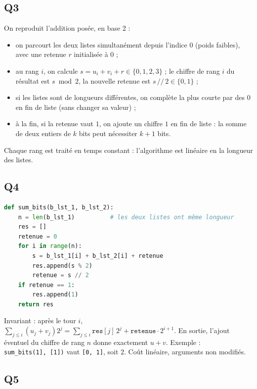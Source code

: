 \documentclass[11pt,a4paper]{article}
\providecommand{\tightlist}{\setlength{\itemsep}{0pt}\setlength{\parskip}{0pt}}
\begin{document}
\hypertarget{q3}{%
\subsection{Q3}\label{q3}}

On reproduit l'addition posée, en base 2 :

\begin{itemize}
\tightlist
\item
  on parcourt les deux listes simultanément depuis l'indice \(0\) (poids faibles), avec une retenue \(r\) initialisée à \(0\) ;
\item
  au rang \(i\), on calcule \(s = u_i + v_i + r \in \{0, 1, 2, 3\}\) ; le chiffre de rang \(i\) du résultat est \(s \bmod 2\), la nouvelle retenue est \(s \,//\, 2 \in \{0, 1\}\) ;
\item
  si les listes sont de longueurs différentes, on complète la plus courte par des \(0\) en fin de liste (sans changer sa valeur) ;
\item
  à la fin, si la retenue vaut \(1\), on ajoute un chiffre \(1\) en fin de liste : la somme de deux entiers de \(k\) bits peut nécessiter \(k+1\) bits.
\end{itemize}

Chaque rang est traité en temps constant : l'algorithme est linéaire en la longueur des listes.

\hypertarget{q4}{%
\subsection{Q4}\label{q4}}

\begin{lstlisting}[language=Python]
def sum_bits(b_lst_1, b_lst_2):
    n = len(b_lst_1)          # les deux listes ont même longueur
    res = []
    retenue = 0
    for i in range(n):
        s = b_lst_1[i] + b_lst_2[i] + retenue
        res.append(s % 2)
        retenue = s // 2
    if retenue == 1:
        res.append(1)
    return res
\end{lstlisting}

Invariant : après le tour \(i\), \(\sum_{j \le i}(u_j + v_j) 2^j = \sum_{j \le i} \texttt{res}[j]\, 2^j + \texttt{retenue} \cdot 2^{i+1}\). En sortie, l'ajout éventuel du chiffre de rang \(n\) donne exactement \(u + v\). Exemple : \texttt{sum\_bits(\allowbreak{}{[}1{]}\allowbreak{},\allowbreak{}\ {[}1{]}\allowbreak{})\allowbreak{}} vaut \texttt{{[}0,\ 1{]}}, soit \(2\). Coût linéaire, arguments non modifiés.

\hypertarget{q5}{%
\subsection{Q5}\label{q5}}
\end{document}
